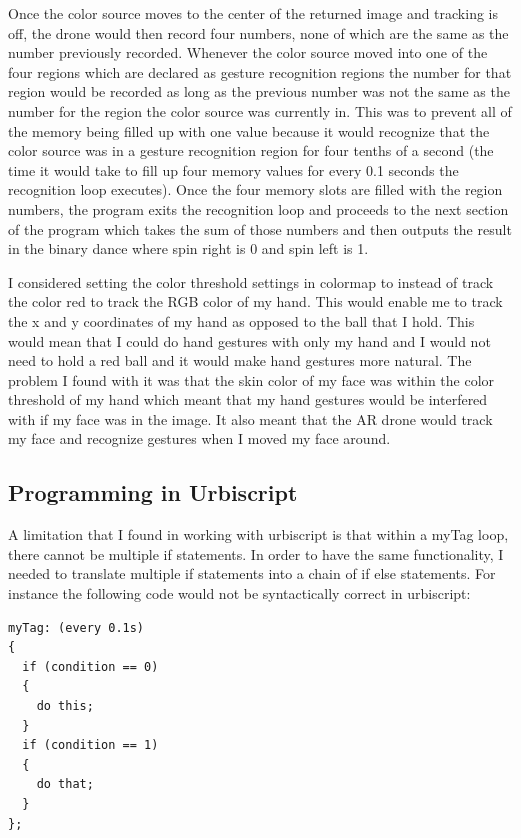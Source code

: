 \documentclass[a4paper,12pt]{report}
\begin{document}
Once the color source moves to the center of the returned image and tracking is off, the drone would then record four numbers, none of which are the same as the number previously recorded. Whenever the color source moved into one of the four regions which are declared as gesture recognition regions the number for that region would be recorded as long as the previous number was not the same as the number for the region the color source was currently in. This was to prevent all of the memory being filled up with one value because it would recognize that the color source was in a gesture recognition region for four tenths of a second (the time it would take to fill up four memory values for every 0.1 seconds the recognition loop executes). 
Once the four memory slots are filled with the region numbers, the program exits the recognition loop and proceeds to the next section of the program which takes the sum of those numbers and then outputs the result in the binary dance where spin right is 0 and spin left is 1.

I considered setting the color threshold settings in colormap to instead of track the color red to track the RGB color of my hand. This would enable me to track the x and y coordinates of my hand as opposed to the ball that I hold. This would mean that I could do hand gestures with only my hand and I would not need to hold a red ball and it would make hand gestures more natural. The problem I found with it was that the skin color of my face was within the color threshold of my hand which meant that my hand gestures would be interfered with if my face was in the image. It also meant that the AR drone would track my face and recognize gestures when I moved my face around.  

\subsection{Programming in Urbiscript}

A limitation that I found in working with urbiscript is that within a myTag loop, there cannot be multiple if statements. In order to have the same functionality, I needed to translate multiple if statements into a chain of if else statements. For instance the following code would not be syntactically correct in urbiscript:

\begin{lstlisting}
myTag: (every 0.1s)
{
  if (condition == 0)
  {
    do this;
  }
  if (condition == 1)
  {
    do that;
  }
};
\end{lstlisting}
\end{document}
